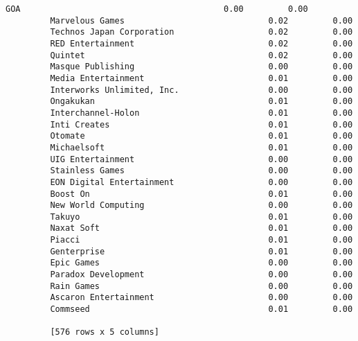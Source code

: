 \documentclass[11pt]{article}
\begin{document}
\begin{Verbatim}[commandchars=\\\{\}]
         GOA                                         0.00         0.00  
         Marvelous Games                             0.02         0.00  
         Technos Japan Corporation                   0.02         0.00  
         RED Entertainment                           0.02         0.00  
         Quintet                                     0.02         0.00  
         Masque Publishing                           0.00         0.00  
         Media Entertainment                         0.01         0.00  
         Interworks Unlimited, Inc.                  0.00         0.00  
         Ongakukan                                   0.01         0.00  
         Interchannel-Holon                          0.01         0.00  
         Inti Creates                                0.01         0.00  
         Otomate                                     0.01         0.00  
         Michaelsoft                                 0.01         0.00  
         UIG Entertainment                           0.00         0.00  
         Stainless Games                             0.00         0.00  
         EON Digital Entertainment                   0.00         0.00  
         Boost On                                    0.01         0.00  
         New World Computing                         0.00         0.00  
         Takuyo                                      0.01         0.00  
         Naxat Soft                                  0.01         0.00  
         Piacci                                      0.01         0.00  
         Genterprise                                 0.01         0.00  
         Epic Games                                  0.00         0.00  
         Paradox Development                         0.00         0.00  
         Rain Games                                  0.00         0.00  
         Ascaron Entertainment                       0.00         0.00  
         Commseed                                    0.01         0.00  
         
         [576 rows x 5 columns]
\end{Verbatim}
            
\end{document}
